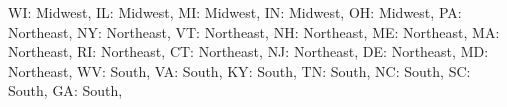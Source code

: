 \documentclass[
  letterpaper,
  DIV=11,
  numbers=noendperiod]{scrartcl}
\newenvironment{Shaded}{\begin{snugshade}}{\end{snugshade}}
\newcommand{\NormalTok}[1]{\textcolor[rgb]{0.00,0.23,0.31}{#1}}
\newcommand{\StringTok}[1]{\textcolor[rgb]{0.13,0.47,0.30}{#1}}
\begin{document}
\begin{Shaded}
\begin{Highlighting}[]
    \StringTok{\textquotesingle{}WI\textquotesingle{}}\NormalTok{: }\StringTok{\textquotesingle{}Midwest\textquotesingle{}}\NormalTok{, }\StringTok{\textquotesingle{}IL\textquotesingle{}}\NormalTok{: }\StringTok{\textquotesingle{}Midwest\textquotesingle{}}\NormalTok{, }\StringTok{\textquotesingle{}MI\textquotesingle{}}\NormalTok{: }\StringTok{\textquotesingle{}Midwest\textquotesingle{}}\NormalTok{, }\StringTok{\textquotesingle{}IN\textquotesingle{}}\NormalTok{: }\StringTok{\textquotesingle{}Midwest\textquotesingle{}}\NormalTok{, }\StringTok{\textquotesingle{}OH\textquotesingle{}}\NormalTok{: }\StringTok{\textquotesingle{}Midwest\textquotesingle{}}\NormalTok{,}
    \StringTok{\textquotesingle{}PA\textquotesingle{}}\NormalTok{: }\StringTok{\textquotesingle{}Northeast\textquotesingle{}}\NormalTok{, }\StringTok{\textquotesingle{}NY\textquotesingle{}}\NormalTok{: }\StringTok{\textquotesingle{}Northeast\textquotesingle{}}\NormalTok{, }\StringTok{\textquotesingle{}VT\textquotesingle{}}\NormalTok{: }\StringTok{\textquotesingle{}Northeast\textquotesingle{}}\NormalTok{, }\StringTok{\textquotesingle{}NH\textquotesingle{}}\NormalTok{: }\StringTok{\textquotesingle{}Northeast\textquotesingle{}}\NormalTok{, }\StringTok{\textquotesingle{}ME\textquotesingle{}}\NormalTok{: }\StringTok{\textquotesingle{}Northeast\textquotesingle{}}\NormalTok{, }\StringTok{\textquotesingle{}MA\textquotesingle{}}\NormalTok{: }\StringTok{\textquotesingle{}Northeast\textquotesingle{}}\NormalTok{,}
    \StringTok{\textquotesingle{}RI\textquotesingle{}}\NormalTok{: }\StringTok{\textquotesingle{}Northeast\textquotesingle{}}\NormalTok{, }\StringTok{\textquotesingle{}CT\textquotesingle{}}\NormalTok{: }\StringTok{\textquotesingle{}Northeast\textquotesingle{}}\NormalTok{, }\StringTok{\textquotesingle{}NJ\textquotesingle{}}\NormalTok{: }\StringTok{\textquotesingle{}Northeast\textquotesingle{}}\NormalTok{, }\StringTok{\textquotesingle{}DE\textquotesingle{}}\NormalTok{: }\StringTok{\textquotesingle{}Northeast\textquotesingle{}}\NormalTok{, }\StringTok{\textquotesingle{}MD\textquotesingle{}}\NormalTok{: }\StringTok{\textquotesingle{}Northeast\textquotesingle{}}\NormalTok{,}
    \StringTok{\textquotesingle{}WV\textquotesingle{}}\NormalTok{: }\StringTok{\textquotesingle{}South\textquotesingle{}}\NormalTok{, }\StringTok{\textquotesingle{}VA\textquotesingle{}}\NormalTok{: }\StringTok{\textquotesingle{}South\textquotesingle{}}\NormalTok{, }\StringTok{\textquotesingle{}KY\textquotesingle{}}\NormalTok{: }\StringTok{\textquotesingle{}South\textquotesingle{}}\NormalTok{, }\StringTok{\textquotesingle{}TN\textquotesingle{}}\NormalTok{: }\StringTok{\textquotesingle{}South\textquotesingle{}}\NormalTok{, }\StringTok{\textquotesingle{}NC\textquotesingle{}}\NormalTok{: }\StringTok{\textquotesingle{}South\textquotesingle{}}\NormalTok{, }\StringTok{\textquotesingle{}SC\textquotesingle{}}\NormalTok{: }\StringTok{\textquotesingle{}South\textquotesingle{}}\NormalTok{, }\StringTok{\textquotesingle{}GA\textquotesingle{}}\NormalTok{: }\StringTok{\textquotesingle{}South\textquotesingle{}}\NormalTok{,}

\end{Highlighting}
\end{Shaded}
\end{document}
